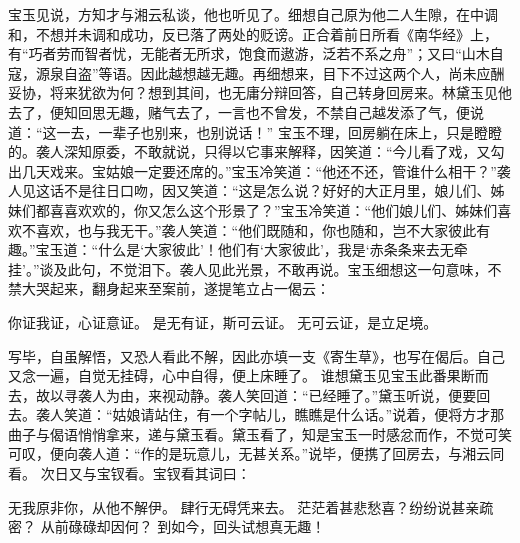 \documentclass[12pt,oneside]{book}
\begin{document}
宝玉见说，方知才与湘云私谈，他也听见了。细想自己原为他二人生隙，在中调和，不想并未调和成功，反已落了两处的贬谤。正合着前日所看《南华经》上，有“巧者劳而智者忧，无能者无所求，饱食而遨游，泛若不系之舟”；又曰“山木自寇，源泉自盗”等语。因此越想越无趣。再细想来，目下不过这两个人，尚未应酬妥协，将来犹欲为何？想到其间，也无庸分辩回答，自己转身回房来。林黛玉见他去了，便知回思无趣，赌气去了，一言也不曾发，不禁自己越发添了气，便说道：“这一去，一辈子也别来，也别说话！”
宝玉不理，回房躺在床上，只是瞪瞪的。袭人深知原委，不敢就说，只得以它事来解释，因笑道：“今儿看了戏，又勾出几天戏来。宝姑娘一定要还席的。”宝玉冷笑道：“他还不还，管谁什么相干？”袭人见这话不是往日口吻，因又笑道：“这是怎么说？好好的大正月里，娘儿们、姊妹们都喜喜欢欢的，你又怎么这个形景了？”宝玉冷笑道：“他们娘儿们、姊妹们喜欢不喜欢，也与我无干。”袭人笑道：“他们既随和，你也随和，岂不大家彼此有趣。”宝玉道：“什么是‘大家彼此’！他们有‘大家彼此’，我是‘赤条条来去无牵挂’。”谈及此句，不觉泪下。袭人见此光景，不敢再说。宝玉细想这一句意味，不禁大哭起来，翻身起来至案前，遂提笔立占一偈云：

你证我证，心证意证。
是无有证，斯可云证。
无可云证，是立足境。

写毕，自虽解悟，又恐人看此不解，因此亦填一支《寄生草》，也写在偈后。自己又念一遍，自觉无挂碍，心中自得，便上床睡了。
谁想黛玉见宝玉此番果断而去，故以寻袭人为由，来视动静。袭人笑回道：“已经睡了。”黛玉听说，便要回去。袭人笑道：“姑娘请站住，有一个字帖儿，瞧瞧是什么话。”说着，便将方才那曲子与偈语悄悄拿来，递与黛玉看。黛玉看了，知是宝玉一时感忿而作，不觉可笑可叹，便向袭人道：“作的是玩意儿，无甚关系。”说毕，便携了回房去，与湘云同看。
次日又与宝钗看。宝钗看其词曰：

无我原非你，从他不解伊。
肆行无碍凭来去。
茫茫着甚悲愁喜？纷纷说甚亲疏密？
从前碌碌却因何？
到如今，回头试想真无趣！
\end{document}
